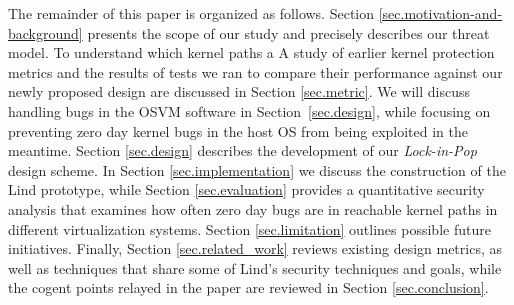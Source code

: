 The remainder of this paper is organized as follows.
Section \ref{sec.motivation-and-background} presents the scope of our study 
and precisely describes our threat model.
To understand which kernel paths a 
A study of earlier kernel protection metrics and the results of tests we ran to compare their performance
against our newly proposed design are discussed in Section \ref{sec.metric}.
We will discuss handling bugs in the OSVM software in 
Section~\ref{sec.design}, while focusing on preventing zero day kernel
bugs in the host OS from being exploited in the meantime.
Section \ref{sec.design} describes the development of our \emph{Lock-in-Pop} 
design scheme. 
In Section \ref{sec.implementation} we discuss the construction of the Lind 
prototype, while Section \ref{sec.evaluation} provides a quantitative security 
analysis that examines how often zero day bugs are in reachable kernel paths
in different virtualization systems.
Section \ref{sec.limitation} outlines possible future initiatives.
Finally, Section \ref{sec.related_work} reviews existing design metrics, as well as techniques that share some of Lind's security techniques and goals,
while the cogent points relayed in the paper are reviewed in Section \ref{sec.conclusion}.
%
